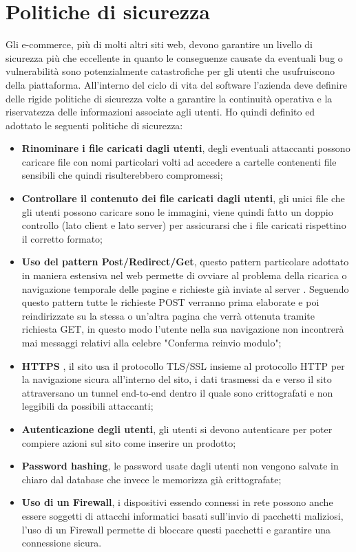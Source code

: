 \section{Politiche di sicurezza}
Gli e-commerce, più di molti altri siti web, devono garantire un livello di sicurezza più che eccellente in quanto le conseguenze causate da eventuali bug o vulnerabilità sono potenzialmente catastrofiche per gli utenti che usufruiscono della piattaforma. All'interno del ciclo di vita del software l'azienda deve definire delle rigide politiche di sicurezza volte a garantire la continuità operativa e la riservatezza delle informazioni associate agli utenti. Ho quindi definito ed adottato le seguenti politiche di sicurezza: 
\begin{itemize}
    \item \textbf{Rinominare i file caricati dagli utenti}, degli eventuali attaccanti possono caricare file con nomi particolari volti ad accedere a cartelle contenenti file sensibili che quindi risulterebbero compromessi; 
    \item \textbf{Controllare il contenuto dei file caricati dagli utenti}, gli unici file che gli utenti possono caricare sono le immagini, viene quindi fatto un doppio controllo (lato client e lato server) per assicurarsi che i file caricati rispettino il corretto formato; 
    \item \textbf{Uso del pattern Post/Redirect/Get}, questo pattern particolare adottato in maniera estensiva nel web permette di ovviare al problema della ricarica o navigazione temporale delle pagine e richieste già inviate al server \cite{PRG}. Seguendo questo pattern tutte le richieste POST verranno prima elaborate e poi reindirizzate su la stessa o un'altra pagina che verrà ottenuta tramite richiesta GET, in questo modo l'utente nella sua navigazione non incontrerà mai messaggi relativi alla celebre "Conferma reinvio modulo"; 
    \item \textbf{HTTPS} \cite{HTTPS}, il sito usa il protocollo TLS/SSL insieme al protocollo HTTP per la navigazione sicura all'interno del sito, i dati trasmessi da e verso il sito attraversano un tunnel end-to-end dentro il quale sono crittografati e non leggibili da possibili attaccanti; 
    \item \textbf{Autenticazione degli utenti}, gli utenti si devono autenticare per poter compiere azioni sul sito come inserire un prodotto; 
    \item \textbf{Password hashing}, le password usate dagli utenti non vengono salvate in chiaro dal database che invece le memorizza già crittografate;
    \item \textbf{Uso di un Firewall}, i dispositivi essendo connessi in rete possono anche essere soggetti di attacchi informatici basati sull'invio di pacchetti maliziosi, l'uso di un Firewall permette di bloccare questi pacchetti e garantire una connessione sicura.  
\end{itemize} 
